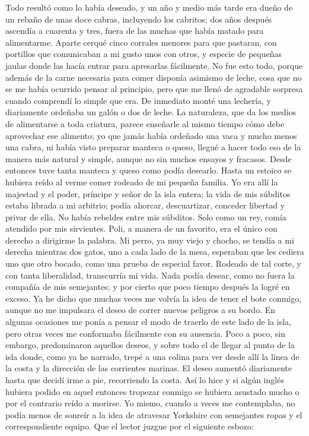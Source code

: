 \documentclass{novela}
\begin{document}
    Todo resultó como lo había deseado, y un año y medio más tarde era dueño de un rebaño de unas doce cabras, incluyendo los cabritos; dos años después ascendía a cuarenta y tres, fuera de las muchas que había matado para alimentarme. Aparte cerqué cinco corrales menores para que pastaran, con portillos que comunicaban a mi gusto unos con otros, y especie de pequeñas jaulas donde las hacía entrar para apresarlas fácilmente.
    No fue esto todo, porque además de la carne necesaria para comer disponía asimismo de leche, cosa que no se me había ocurrido pensar al principio, pero que me llenó de agradable sorpresa cuando comprendí lo simple que era. De inmediato monté una lechería, y diariamente ordeñaba un galón o dos de leche. La naturaleza, que da los medios de alimentarse a toda criatura, parece enseñarle al mismo tiempo cómo debe aprovechar ese alimento; yo que jamás había ordeñado una vaca y mucho menos una cabra, ni había visto preparar manteca o queso, llegué a hacer todo eso de la manera más natural y simple, aunque no sin muchos ensayos y fracasos. Desde entonces tuve tanta manteca y queso como podía desearlo.
    Hasta un estoico se hubiera reído al verme comer rodeado de mi pequeña familia. Yo era allí la majestad y el poder, príncipe y señor de la isla entera; la vida de mis súbditos estaba librada a mi arbitrio; podía ahorcar, descuartizar, conceder libertad y privar de ella. No había rebeldes entre mis súbditos.
    Solo como un rey, comía atendido por mis sirvientes.
    Poli, a manera de un favorito, era el único con derecho a dirigirme la palabra. Mi perro, ya muy viejo y chocho, se tendía a mi derecha mientras dos gatos, uno a cada lado de la mesa, esperaban que les cediera uno que otro bocado, como una prueba de especial favor.
    Rodeado de tal corte, y con tanta liberalidad, transcurría mi vida. Nada podía desear, como no fuera la compañía de mis semejantes; y por cierto que poco tiempo después la logré en exceso.
    Ya he dicho que muchas veces me volvía la idea de tener el bote conmigo, aunque no me impulsara el deseo de correr nuevos peligros a su bordo. En algunas ocasiones me ponía a pensar el modo de traerlo de este lado de la isla, pero otras veces me conformaba fácilmente con su ausencia. Poco a poco, sin embargo, predominaron aquellos deseos, y sobre todo el de llegar al punto de la isla donde, como ya he narrado, trepé a una colina para ver desde allí la línea de la costa y la dirección de las corrientes marinas. El deseo aumentó diariamente hasta que decidí irme a pie, recorriendo la costa. Así lo hice y si algún inglés hubiera podido en aquel entonces tropezar conmigo se hubiera asustado mucho o por el contrario reído a morirse. Yo mismo, cuando a veces me contemplaba, no podía menos de sonreír a la idea de atravesar Yorkshire con semejantes ropas y el correspondiente equipo. Que el lector juzgue por el siguiente esbozo:
\end{document}
